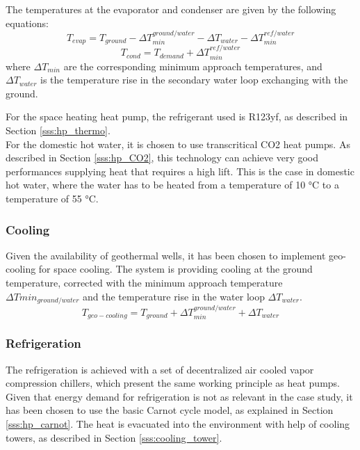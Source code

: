 \documentclass{article}
\begin{document}
The temperatures at the evaporator and condenser are given by the following equations:
\begin{equation}
    T_{evap} = T_{ground} - \Delta T_{min}^{ground/water} - \Delta T_{water} - \Delta T_{min}^{ref/water}
\end{equation}
\begin{equation}
    T_{cond} = T_{demand} + \Delta T_{min}^{ref/water}
\end{equation}
where $\Delta T_{min}$ are the corresponding minimum approach temperatures, and $\Delta T_{water}$ is the temperature rise in the secondary water loop exchanging with the ground.

For the space heating heat pump, the refrigerant used is R123yf, as described in Section \ref{sss:hp_thermo}.\\

For the domestic hot water, it is chosen to use transcritical CO2 heat pumps. As described in Section \ref{sss:hp_CO2}, this technology can achieve very good performances supplying heat that requires a high lift. This is the case in domestic hot water, where the water has to be heated from a temperature of 10 \si{\celsius} to a temperature of 55 \si{\celsius}.

\subsubsection{Cooling}
Given the availability of geothermal wells, it has been chosen to implement geo-cooling for space cooling. The system is providing cooling at the ground temperature, corrected with the minimum approach temperature $\Delta Tmin_{ground/water}$ and the temperature rise in the water loop $\Delta T_{water}$.
\begin{equation}
T_{geo-cooling} = T_{ground} + \Delta T_{min}^{ground/water} + \Delta T_{water}
\end{equation}

\subsubsection{Refrigeration}
The refrigeration is achieved with a set of decentralized air cooled vapor compression chillers, which present the same working principle as heat pumps. Given that energy demand for refrigeration is not as relevant in the case study, it has been chosen to use the basic Carnot cycle model, as explained in Section \ref{sss:hp_carnot}. The heat is evacuated into the environment with help of cooling towers, as described in Section \ref{sss:cooling_tower}.
\end{document}
